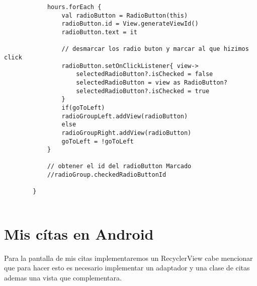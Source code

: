 \documentclass[a4paper]{article}
\begin{document}
\begin{lstlisting}
			hours.forEach {
				val radioButton = RadioButton(this)
				radioButton.id = View.generateViewId()
				radioButton.text = it
				
				// desmarcar los radio buton y marcar al que hizimos click
				radioButton.setOnClickListener{ view->
					selectedRadioButton?.isChecked = false
					selectedRadioButton = view as RadioButton?
					selectedRadioButton?.isChecked = true
				}
				if(goToLeft)
				radioGroupLeft.addView(radioButton)
				else
				radioGroupRight.addView(radioButton)
				goToLeft = !goToLeft
			}
			
			// obtener el id del radioButton Marcado
			//radioGroup.checkedRadioButtonId
			
		}
			
		\end{lstlisting}
		
    
	
		\section{Mis cítas en Android}
		
		Para la pantalla de mis citas implementaremos un RecyclerView cabe mencionar que para hacer esto es necesario implementar un adaptador y una clase de citas ademas una vista que complementara.
		
\end{document}
